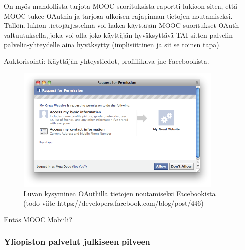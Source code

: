 \documentclass[finnish,gradu]{tktltiki}
\begin{document}
  On myös mahdollista tarjota MOOC-suorituksista raportti lukioon siten, että MOOC tukee OAuthia ja tarjoaa ulkoisen rajapinnan tietojen noutamiseksi. Tällöin lukion tietojärjestelmä voi hakea käyttäjän MOOC-suoritukset OAuth-valtuutuksella, joka voi olla joko käyttäjän hyväksyttävä TAI sitten palvelin-palvelin-yhteydelle aina hyväksytty (implisiittinen ja sit se toinen tapa).

  Auktorisointi: Käyttäjän yhteystiedot, profiilikuva jne Facebookista.

  \begin{figure}
    \centering
    \includegraphics[width=0.9\textwidth]{images/facebook_authorization_contact_info.png}
    \caption{Luvan kysyminen OAuthilla tietojen noutamiseksi Facebookista (todo viite https://developers.facebook.com/blog/post/446)}
    \label{fig:luvan_kysyminen_oauth_fb}
  \end{figure}




  Entäs MOOC Mobiili? %



  \subsubsection{Yliopiston palvelut julkiseen pilveen} %
  \label{ssub:yliopiston_sähköpostit_pilveen}
\end{document}
